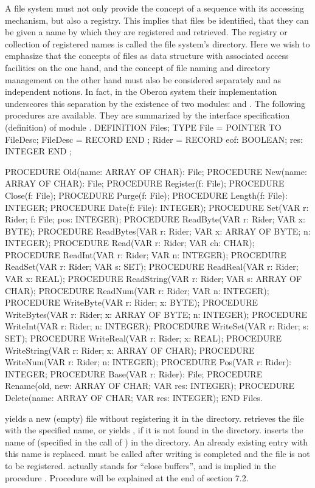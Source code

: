 A file system must not only provide the concept of a sequence with its accessing mechanism, but also a registry. This implies that files be identified, that they can be given a name by which they are registered and retrieved. The registry or collection of registered names is called the file system's directory. Here we wish to emphasize that the concepts of files as data structure with associated access facilities on the one hand, and the concept of file naming and directory management on the other hand must also be considered separately and as independent notions. In fact, in the Oberon system their implementation underscores this separation by the existence of two modules:  and . The following procedures are available. They are summarized by the interface specification (definition) of module .
\begintt
DEFINITION Files;
  TYPE File = POINTER TO FileDesc;
     FileDesc = RECORD END ;
     Rider = RECORD eof: BOOLEAN; res: INTEGER END ;

  PROCEDURE Old(name: ARRAY OF CHAR): File;
  PROCEDURE New(name: ARRAY OF CHAR): File;
  PROCEDURE Register(f: File);
  PROCEDURE Close(f: File);
  PROCEDURE Purge(f: File);
  PROCEDURE Length(f: File): INTEGER;
  PROCEDURE Date(f: File): INTEGER);
  PROCEDURE Set(VAR r: Rider; f: File; pos: INTEGER);
  PROCEDURE ReadByte(VAR r: Rider; VAR x: BYTE);
  PROCEDURE ReadBytes(VAR r: Rider; VAR x: ARRAY OF BYTE; n: INTEGER);
  PROCEDURE Read(VAR r: Rider; VAR ch: CHAR);
  PROCEDURE ReadInt(VAR r: Rider; VAR n: INTEGER);
  PROCEDURE ReadSet(VAR r: Rider; VAR s: SET);
  PROCEDURE ReadReal(VAR r: Rider; VAR x: REAL);
  PROCEDURE ReadString(VAR r: Rider; VAR s: ARRAY OF CHAR);
  PROCEDURE ReadNum(VAR r: Rider; VAR n: INTEGER);
  PROCEDURE WriteByte(VAR r: Rider; x: BYTE);
  PROCEDURE WriteBytes(VAR r: Rider; x: ARRAY OF BYTE; n: INTEGER);
  PROCEDURE WriteInt(VAR r: Rider; n: INTEGER);
  PROCEDURE WriteSet(VAR r: Rider; s: SET);
  PROCEDURE WriteReal(VAR r: Rider; x: REAL);
  PROCEDURE WriteString(VAR r: Rider; x: ARRAY OF CHAR);
  PROCEDURE WriteNum(VAR r: Rider; n: INTEGER);
  PROCEDURE Pos(VAR r: Rider): INTEGER;
  PROCEDURE Base(VAR r: Rider): File;
  PROCEDURE Rename(old, new: ARRAY OF CHAR; VAR res: INTEGER);
  PROCEDURE Delete(name: ARRAY OF CHAR; VAR res: INTEGER);
END Files.
\endtt

\noindent {} yields a new (empty) file without registering it in the directory.  retrieves the file with the specified name, or yields , if it is not found in the directory.  inserts the name of  (specified in the call of ) in the directory. An already existing entry with this name is replaced.  must be called after writing is completed and the file is not to be registered.  actually stands for ``close buffers'', and is implied in the procedure . Procedure  will be explained at the end of section 7.2.

